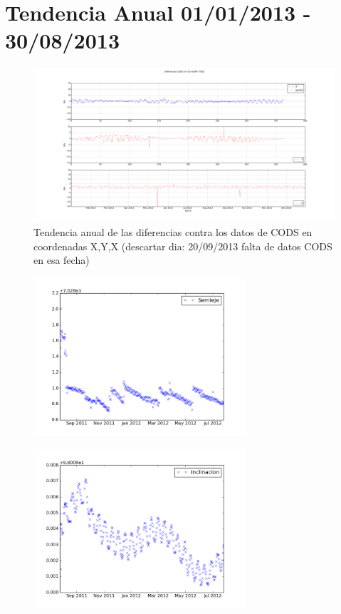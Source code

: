 \section*{Tendencia Anual 01/01/2013 - 30/08/2013}
\begin{figure}[!h]
\centering
  \includegraphics[width=\textwidth]{imagenes/SACD2013todEjesajustados}
  \caption{Tendencia anual de las diferencias contra los datos de CODS en coordenadas X,Y,X (descartar dia: 20/09/2013 falta de datos CODS en esa fecha)}
\end{figure}
\begin{figure}[!h]
\centering
  \includegraphics[width=0.7\textwidth]{imagenes/sacDtendSemi}
\end{figure}
\begin{figure}[!h]
\centering
  \includegraphics[width=0.7\textwidth]{imagenes/sacDtendInc}
\end{figure}


